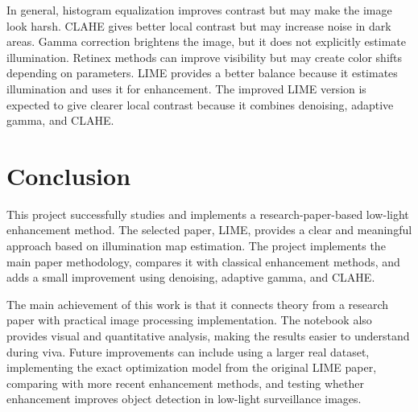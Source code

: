 \documentclass[11pt]{article}
\begin{document}
\begin{table}[htbp]
\caption{Quantitative Comparison of Enhancement Methods for the Tested Image}
\label{tab:metrics}
\centering
{}
\end{table}

In general, histogram equalization improves contrast but may make the image look harsh. CLAHE gives better local contrast but may increase noise in dark areas. Gamma correction brightens the image, but it does not explicitly estimate illumination. Retinex methods can improve visibility but may create color shifts depending on parameters. LIME provides a better balance because it estimates illumination and uses it for enhancement. The improved LIME version is expected to give clearer local contrast because it combines denoising, adaptive gamma, and CLAHE.

\section{Conclusion}
This project successfully studies and implements a research-paper-based low-light enhancement method. The selected paper, LIME, provides a clear and meaningful approach based on illumination map estimation. The project implements the main paper methodology, compares it with classical enhancement methods, and adds a small improvement using denoising, adaptive gamma, and CLAHE.

The main achievement of this work is that it connects theory from a research paper with practical image processing implementation. The notebook also provides visual and quantitative analysis, making the results easier to understand during viva. Future improvements can include using a larger real dataset, implementing the exact optimization model from the original LIME paper, comparing with more recent enhancement methods, and testing whether enhancement improves object detection in low-light surveillance images.
\end{document}
